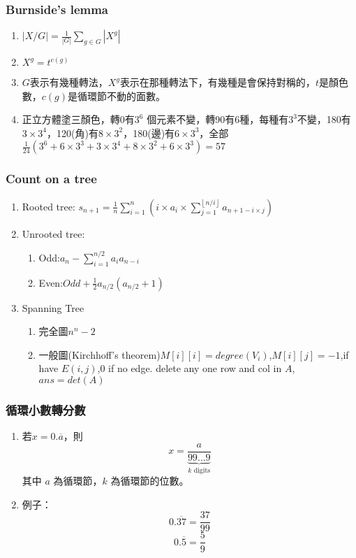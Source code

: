 \subsubsection{Burnside's lemma}
\begin{enumerate}\itemsep = -3pt
	\item $|X/G| = \frac{1}{|G|}\sum_{g \in G}|X^g|$
	\item $X^g=t^{c(g)}$
	\item $G$表示有幾種轉法，$X^g$表示在那種轉法下，有幾種是會保持對稱的，$t$是顏色數，$c(g)$是循環節不動的面數。
	\item 正立方體塗三顏色，轉0有$3^6$ 個元素不變，轉90有6種，每種有$3^3$不變，180有$3\times 3^4$，120(角)有$8\times 3^2$，180(邊)有$6\times 3^3$，全部$\frac{1}{24}\left(3^6+6\times 3^3 + 3 \times 3^4 + 8 \times 3^2 + 6 \times 3^3 \right) = 57$
\end{enumerate}

\subsubsection{Count on a tree}
\begin{enumerate}\itemsep = -3pt
	\item Rooted tree: $s_{n+1}=\frac{1}{n}\sum_{i=1}^{n}(i\times a_i\times \sum_{j=1}^{\left \lfloor  n/i\right \rfloor} a_{n+1-i\times j})$
	\item Unrooted tree: 
	\begin{enumerate}\itemsep = -2pt
		\item Odd:$a_n-\sum_{i=1}^{n/2}a_ia_{n-i}$
		\item Even:$Odd+\frac{1}{2}a_{n/2}(a_{n/2}+1)$
	\end{enumerate}
	\item Spanning Tree
	\begin{enumerate}\itemsep = -2pt
		\item 完全圖$n^n-2$
		\item 一般圖(Kirchhoff's theorem)$M[i][i]=degree(V_i)$,$M[i][j]=-1$,if have $E(i,j)$,$0$ if no edge. delete any one row and col in $A$, $ans = det(A)$
	\end{enumerate}
\end{enumerate}

\subsubsection{循環小數轉分數}
\begin{enumerate}\itemsep = -3pt
\item 若$x=0.\overline{a}$，則
\[
x = \frac{a}{\underbrace{99\ldots9}_{k \text{ digits}}}
\]
其中 $a$ 為循環節，$k$ 為循環節的位數。
\item 例子：
\[
0.\overline{37} = \frac{37}{99}
\]
\[
0.\overline{5} = \frac{5}{9}
\]
\end{enumerate}

